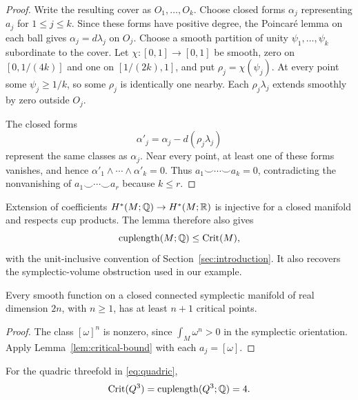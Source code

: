 \begin{proof}
Write the resulting cover as $O_1,\ldots,O_k$. Choose closed forms
$\alpha_j$ representing $a_j$ for $1\le j\le k$. Since these forms
have positive degree, the Poincar\'e lemma on each ball gives
$\alpha_j=d\lambda_j$ on $O_j$. Choose a smooth partition of unity
$\psi_1,\ldots,\psi_k$ subordinate to the cover. Let
$\chi:[0,1]\to[0,1]$ be smooth, zero on $[0,1/(4k)]$ and one on
$[1/(2k),1]$, and put $\rho_j=\chi(\psi_j)$. At every point some
$\psi_j\ge1/k$, so some $\rho_j$ is identically one nearby.
Each $\rho_j\lambda_j$ extends smoothly by zero outside $O_j$.

The closed forms
\[
 \alpha'_j=\alpha_j-d(\rho_j\lambda_j)
\]
represent the same classes as $\alpha_j$. Near every point, at least one
of these forms vanishes, and hence $\alpha'_1\wedge\cdots\wedge\alpha'_k=0$.
Thus $a_1\smile\cdots\smile a_k=0$, contradicting the nonvanishing
of $a_1\smile\cdots\smile a_r$ because $k\le r$.
\end{proof}

Extension of coefficients $H^*(M;\mathbb Q)\to H^*(M;\mathbb R)$ is injective
for a closed manifold and respects cup products. The lemma therefore
also gives
\begin{equation}\label{eq:cup-critical}
 \operatorname{cuplength}(M;\mathbb Q)\le\operatorname{Crit}(M),
\end{equation}
with the unit-inclusive convention of Section~\ref{sec:introduction}.
It also recovers the symplectic-volume obstruction used in our example.

\begin{corollary}\label{cor:symplectic-critical}
Every smooth function on a closed connected symplectic manifold of real
dimension $2n$, with $n\ge1$, has at least $n+1$ critical points.
\end{corollary}

\begin{proof}
The class $[\omega]^n$ is nonzero, since
$\int_M\omega^n>0$ in the symplectic orientation. Apply
Lemma~\ref{lem:critical-bound} with each $a_j=[\omega]$.
\end{proof}

\begin{corollary}\label{cor:quadric-critical}
For the quadric threefold in \eqref{eq:quadric},
\[
 \operatorname{Crit}(Q^3)=\operatorname{cuplength}(Q^3;\mathbb Q)=4.
\]
\end{corollary}

